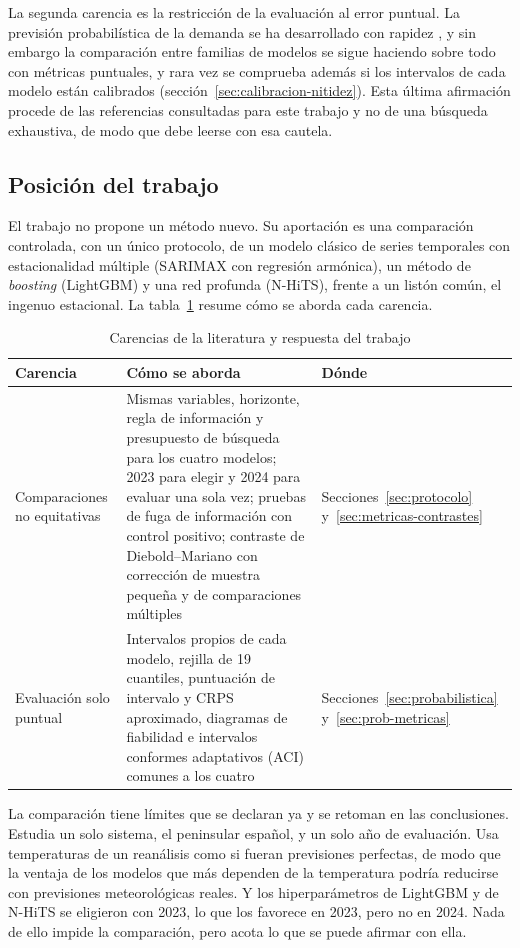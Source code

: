 La segunda carencia es la restricción de la evaluación al error puntual. La previsión
probabilística de la demanda se ha desarrollado con rapidez
\parencite{hong2016probabilistic}, y sin embargo la comparación entre familias de
modelos se sigue haciendo sobre todo con métricas puntuales, y rara vez se
comprueba además si los intervalos de cada modelo están calibrados
(sección~\ref{sec:calibracion-nitidez}). Esta última afirmación procede de las
referencias consultadas para este trabajo y no de una búsqueda exhaustiva, de
modo que debe leerse con esa cautela.

\subsection{Posición del trabajo}\label{sec:posicion}

El trabajo no propone un método nuevo. Su aportación es una comparación
controlada, con un único protocolo, de un modelo clásico de series temporales
con estacionalidad múltiple (SARIMAX con regresión armónica), un método de
\textit{boosting} (LightGBM) y una red profunda (N-HiTS), frente a un listón
común, el ingenuo estacional. La tabla~\ref{tab:carencias-respuesta} resume cómo
se aborda cada carencia.

\begin{table}[htbp]
	\centering
	\caption{Carencias de la literatura y respuesta del trabajo}
	\label{tab:carencias-respuesta}
	\small
	\begin{tabularx}{\textwidth}{>{\raggedright\arraybackslash}p{4.2cm} >{\raggedright\arraybackslash}X >{\raggedright\arraybackslash}p{2.6cm}}
		\hline
		\textbf{Carencia} & \textbf{Cómo se aborda} & \textbf{Dónde} \\
		\hline
		Comparaciones no equitativas & Mismas variables, horizonte, regla de información y presupuesto de búsqueda para los cuatro modelos; 2023 para elegir y 2024 para evaluar una sola vez; pruebas de fuga de información con control positivo; contraste de Diebold--Mariano con corrección de muestra pequeña y de comparaciones múltiples & Secciones~\ref{sec:protocolo} y~\ref{sec:metricas-contrastes} \\
		Evaluación solo puntual & Intervalos propios de cada modelo, rejilla de 19 cuantiles, puntuación de intervalo y CRPS aproximado, diagramas de fiabilidad e intervalos conformes adaptativos (ACI) comunes a los cuatro & Secciones~\ref{sec:probabilistica} y~\ref{sec:prob-metricas} \\
		\hline
	\end{tabularx}
\end{table}

La comparación tiene límites que se declaran ya y se retoman en las
conclusiones. Estudia un solo sistema, el peninsular español, y un solo año de
evaluación. Usa temperaturas de un reanálisis como si fueran previsiones
perfectas, de modo que la ventaja de los modelos que más dependen de la
temperatura podría reducirse con previsiones meteorológicas reales. Y los
hiperparámetros de LightGBM y de N-HiTS se eligieron con 2023, lo que los
favorece en 2023, pero no en 2024. Nada de ello impide la
comparación, pero acota lo que se puede afirmar con ella.
